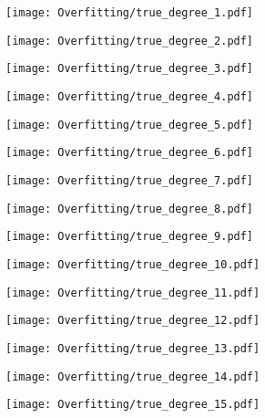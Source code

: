 \documentclass[xcolor=pdftex,dvipsnames,table]{beamer}
\begin{document}
\frame
{
	\begin{center}
		\texttt{[image: Overfitting/true\_degree\_1.pdf]}
	\end{center}
}
\frame
{
	\begin{center}
		\texttt{[image: Overfitting/true\_degree\_2.pdf]}
	\end{center}
}
\frame
{
	\begin{center}
		\texttt{[image: Overfitting/true\_degree\_3.pdf]}
	\end{center}
}
\frame
{
	\begin{center}
		\texttt{[image: Overfitting/true\_degree\_4.pdf]}
	\end{center}
}
\frame
{
	\begin{center}
		\texttt{[image: Overfitting/true\_degree\_5.pdf]}
	\end{center}
}
\frame
{
	\begin{center}
		\texttt{[image: Overfitting/true\_degree\_6.pdf]}
	\end{center}
}
\frame
{
	\begin{center}
		\texttt{[image: Overfitting/true\_degree\_7.pdf]}
	\end{center}
}
\frame
{
	\begin{center}
		\texttt{[image: Overfitting/true\_degree\_8.pdf]}
	\end{center}
}
\frame
{
	\begin{center}
		\texttt{[image: Overfitting/true\_degree\_9.pdf]}
	\end{center}
}
\frame
{
	\begin{center}
		\texttt{[image: Overfitting/true\_degree\_10.pdf]}
	\end{center}
}
\frame
{
	\begin{center}
		\texttt{[image: Overfitting/true\_degree\_11.pdf]}
	\end{center}
}
\frame
{
	\begin{center}
		\texttt{[image: Overfitting/true\_degree\_12.pdf]}
	\end{center}
}
\frame
{
	\begin{center}
		\texttt{[image: Overfitting/true\_degree\_13.pdf]}
	\end{center}
}
\frame
{
	\begin{center}
		\texttt{[image: Overfitting/true\_degree\_14.pdf]}
	\end{center}
}
\frame
{
	\begin{center}
		\texttt{[image: Overfitting/true\_degree\_15.pdf]}
	\end{center}
}
\end{document}
